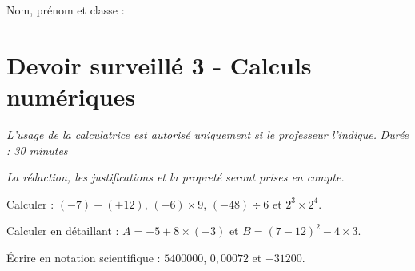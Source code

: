 \documentclass[a4paper,10pt]{report}
\begin{document}
\pagestyle{empty}
\noindent Nom, prénom et classe : \dotfill

\section*{Devoir surveillé 3 - Calculs numériques}

\noindent \textit{L'usage de la calculatrice est autorisé uniquement si le professeur l'indique.} \hfill \textit{Durée : 30 minutes}

\medskip
\noindent \textit{La rédaction, les justifications et la propreté seront prises en compte.}


\begin{ex}[Calculs]
Calculer : $(-7)+(+12)$, $(-6)\times 9$, $(-48)\div 6$ et $2^3\times2^4$.
\medskip\noindent\grandscarreaux{\linewidth}{4cm}
\end{ex}
\begin{ex}[Priorités]
Calculer en détaillant : $A=-5+8\times(-3)$ et $B=(7-12)^2-4\times3$.
\medskip\noindent\grandscarreaux{\linewidth}{4cm}
\end{ex}
\begin{ex}
Écrire en notation scientifique : $5400000$, $0,00072$ et $-31200$.
\medskip\noindent\grandscarreaux{\linewidth}{3cm}
\end{ex}
\end{document}
